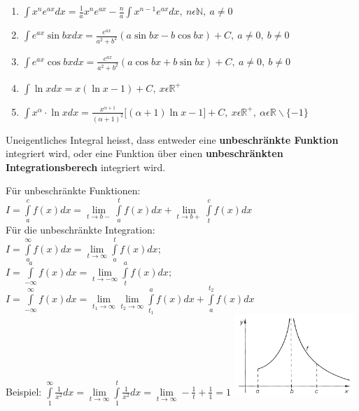 \begin{enumerate}
  \item $ \int x^ne^{ax}dx=\frac{1}{a}x^ne^{ax}-\frac{n}{a}\int
  x^{n-1}e^{ax}dx,\ n\epsilon\mathbb N,\ a\neq0 $
  \item $ \int e^{ax}\sin bxdx=\frac{e^{ax}}{a^2+b^2}(a\sin bx-b\cos bx)+C,\
  a\neq0,\ b\neq0 $
  \item $ \int e^{ax}\cos bxdx=\frac{e^{ax}}{a^2+b^2}(a\cos bx + b\sin bx)+C,\
  a\neq0,\ b\neq0 $
  \item $ \int\ln x dx = x(\ln x-1)+C,\ x\epsilon\mathbb R^+ $
  \item $ \int x^\alpha \cdot \ln xdx =
  \frac{x^{\alpha+1}}{(\alpha+1)^2}\lbrack(\alpha+1)\ln x-1\rbrack + C,\
  x\epsilon\mathbb R^+,\ \alpha\epsilon\mathbb R\backslash\{-1\} $
\end{enumerate}

  Uneigentliches Integral heisst, dass entweder eine \textbf{unbeschr\"ankte
  Funktion} integriert wird, oder eine Funktion \"uber einen
  \textbf{unbeschr\"ankten Integrationsberech} integriert wird.\\


  \begin{multicols}{2}
  F\"ur unbeschr\"ankte Funktionen:\\
  $ I =\int\limits _{a}^{c}f(x)dx=\lim\limits_{t\to
  b-}\int\limits_{a}^{t}f(x)dx+\lim\limits_{t\to b+}\int\limits_{t}^{c}f(x)dx
  $ \\
  F\"ur die unbeschr\"ankte Integration:\\
  $ I =\int\limits _{a} ^{\infty} f(x)dx= \lim \limits_{t\to \infty}\int \limits
  _{a} ^{t}f(x)dx; $ \\
  $ I =\int\limits ^{a} _{-\infty} f(x)dx= \lim \limits_{t\to -\infty}\int
  \limits _{t} ^{a}f(x)dx; $ \\
  $I =\int\limits _{-\infty} ^{\infty} f(x)dx = \lim \limits_{t_1\to \infty} \lim
  \limits
  _{t_2 \to  \infty}\int \limits _{t_1} ^{a}f(x)dx +
  \int\limits_{a}^{t_2}f(x)dx$\\
  Beispiel: $\int\limits_{1}^{\infty}\frac{1}{x^2}dx=\lim\limits_{t\to
  \infty}\int\limits_{1}^{t}\frac{1}{x^2}dx=\lim\limits_{t\to \infty}-\frac{1}{t}+\frac{1}{1}=1$
  \includegraphics[width=4.5cm]{./bilder/unbeschraenkteFunktion.png}
  \end{multicols}
  
